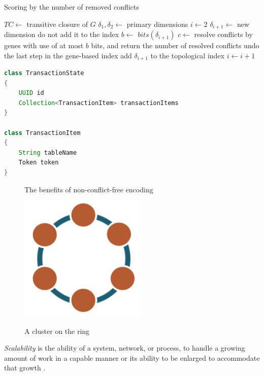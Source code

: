 %
%

\begin{algorithm}
  \caption{Scoring by the number of removed conflicts}
  \label{alg:scoringByNumOfRemovedConflicts}
  \begin{algorithmic}
    \State $TC \gets$ transitive closure of $G$
    \State $\delta_1, \delta_2 \gets$ primary dimensions
    \State $i \gets 2$
      \State $\delta_{i+1} \gets$ new dimension \Comment do not add it to the index
      \State $b \gets$ $bits(\delta_{i+1})$
      \State $c \gets$ resolve conflicts by genes with use of at most $b$ bits, and return the number of resolved
      conflicts
        \State undo the last step in the gene-based index
        \State add $\delta_{i+1}$ to the topological index
        \State $i \gets i+1$
      \EndIf
    \EndWhile   
  \end{algorithmic}
\end{algorithm}


\begin{lstlisting}[language=Java,style=outcode,label={lst:txState},caption={Transaction State data structure}]
class TransactionState
{
    UUID id
    Collection<TransactionItem> transactionItems    
}

class TransactionItem
{
    String tableName
    Token token
}
\end{lstlisting}

\begin{figure}[h]
  \centering
  \caption{The benefits of non-conflict-free encoding}
  \label{fig:compressionBenefits}
\end{figure}

\begin{figure}[h]
  \centering
  \label{fig:archClusterA}\includegraphics[height=60mm]{images/cassandra-ring.png}\hspace{10mm}
  \label{fig:archCluster}
  \caption{A cluster on the ring}
\end{figure}

\begin{definition}
  \label{def:scalability}
  \emph{Scalability} is the ability of a system, network, or process, to handle a growing amount of work in a capable manner or its ability to be enlarged to accommodate that growth \cite{DistributeSystemsForFunAndProfit}. 
\end{definition}






